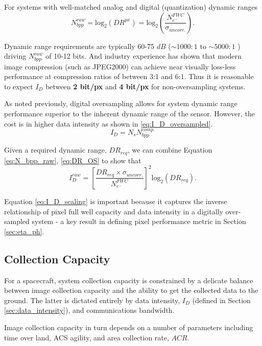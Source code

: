 \documentclass[]{spieman}  %
\begin{document}
For systems with well-matched analog and digital (quantization) dynamic ranges
\begin{equation}
	\label{eq:N_bpp_raw}
    N_{bpp}^{raw} = \textrm{log}_2(DR^{px}) = \textrm{log}_2\left(\frac{N_{e^-}^{FWC}}{\sigma_{uncorr.}}\right).
\end{equation}

Dynamic range requirements are typically 60-75 $dB$ ($\sim 1000:1$ to $\sim 5000:1$ ) driving $N_{bpp}^{raw}$ of 10-12 bits.  And industry experience has shown that modern image compression (such as JPEG2000) can achieve near visually loss-less performance at compression ratios of between 3:1 and 6:1.  Thus it is reasonable to expect $I_D$ between \textbf{2 bit/px} and \textbf{4 bit/px} for non-oversampling systems.

As noted previously, digital oversampling allows for system dynamic range performance superior to the inherent dynamic range of the sensor.  However, the cost is in higher data intensity as shown in \eqref{eq:I_D_oversampled}.  
\begin{equation}
	\label{eq:I_D_oversampled}
    I_D = N_s N_{bpp}^{comp.} 
\end{equation}

Given a required dynamic range, $DR_{req}$, we can combine Equation \eqref{eq:N_bpp_raw}, \eqref{eq:DR_OS} to show that
\begin{equation}
    \label{eq:I_D_scaling}
    I_D^{raw} = \left[\frac{DR_{req}\times \sigma_{uncorr.}}{N_{e^-}^{FWC}}\right]^2 \textrm{log}_2 (DR_{req}).
\end{equation}

Equation \eqref{eq:I_D_scaling} is important because it captures the inverse relationship of pixel full well capacity and data intensity in a digitally over-sampled system - a key result in defining pixel performance metric in Section \ref{sec:eta_ph}.

\subsection{Collection Capacity}
\label{sec:capacity}
For a spacecraft, system collection capacity is constrained by a delicate balance between image collection capacity and the ability to get the collected data to the ground.  The latter is dictated entirely by data intensity, $I_D$ (defined in Section \ref{sec:data_intensity}), and communications bandwidth.  

Image collection capacity in turn depends on a number of parameters including time over land, ACS agility, and area collection rate, $ACR$.
\end{document}
